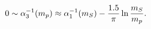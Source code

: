\begin{equation}
 0 \sim \alpha_3^{-1}(m_p)
   \approx \alpha_1^{-1}(m_S) - {1.5\over\pi}\ln{m_S\over m_p}.
 \label{eq:14}
 \end{equation}

